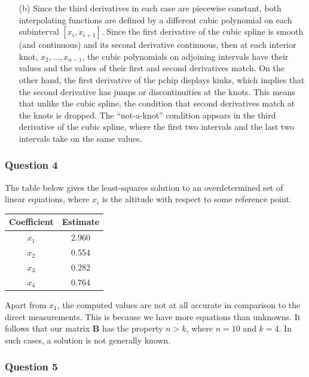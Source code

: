 \documentclass[11pt,a4paper]{article}
\begin{document}
\begin{enumerate}
	\item[(b)] Since the third derivatives in each case are piecewise constant, both interpolating functions are defined by a different cubic polynomial on each subinterval $[x_i,x_{i+1}]$. Since the first derivative of the cubic spline is smooth (and continuous) and its second derivative continuous, then at each interior knot, $x_2, \ldots , x_{n-1}$, the cubic polynomials on adjoining intervals have their values and the values of their first and second derivatives match. On the other hand,  the first derivative of the pchip displays kinks, which implies that the second derivative has jumps or discontinuities at the knots. This means that unlike the cubic spline, the condition that second derivatives match at the knots is dropped. The ``not-a-knot'' condition appears in the third derivative of the cubic spline, where the first two intervals and the last two intervals take on the same values.

\end{enumerate}

\subsubsection*{Question 4} The table below gives the least-squares solution to an overdetermined set of linear equations, where $x_i$ is the altitude with respect to some reference point.
	\begin{center}
		\begin{tabular}{|c|c|}
		\hline
		Coefficient &Estimate \\
		\hline
		$x_1$ &2.960 \\
		$x_2$ &0.554 \\
		$x_3$ &0.282 \\
		$x_4$ &0.764 \\
		\hline
		\end{tabular}
	\end{center}
Apart from $x_1$, the computed values are not at all accurate in comparison to the direct measurements. This is because we have more equations than unknowns. It follows that our matrix $\mathbf{B}$ has the property $n>k$, where $n=10$ and $k=4$. In such cases, a solution is not generally known.

\pagebreak

\subsubsection*{Question 5}
\end{document}
